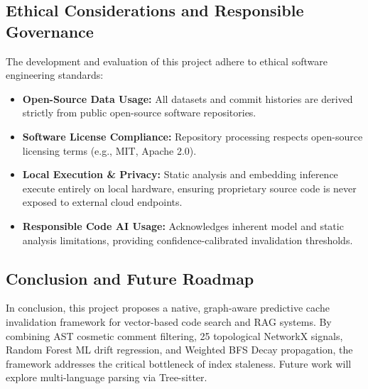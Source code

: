\documentclass[conference]{IEEEtran}
\begin{document}
\subsection{Ethical Considerations and Responsible Governance}
The development and evaluation of this project adhere to ethical software engineering standards:
\begin{itemize}
    \item \textbf{Open-Source Data Usage:} All datasets and commit histories are derived strictly from public open-source software repositories.
    \item \textbf{Software License Compliance:} Repository processing respects open-source licensing terms (e.g., MIT, Apache 2.0).
    \item \textbf{Local Execution \& Privacy:} Static analysis and embedding inference execute entirely on local hardware, ensuring proprietary source code is never exposed to external cloud endpoints.
    \item \textbf{Responsible Code AI Usage:} Acknowledges inherent model and static analysis limitations, providing confidence-calibrated invalidation thresholds.
\end{itemize}

\subsection{Conclusion and Future Roadmap}
In conclusion, this project proposes a native, graph-aware predictive cache invalidation framework for vector-based code search and RAG systems. By combining AST cosmetic comment filtering, 25 topological NetworkX signals, Random Forest ML drift regression, and Weighted BFS Decay propagation, the framework addresses the critical bottleneck of index staleness. Future work will explore multi-language parsing via Tree-sitter.
\end{document}
